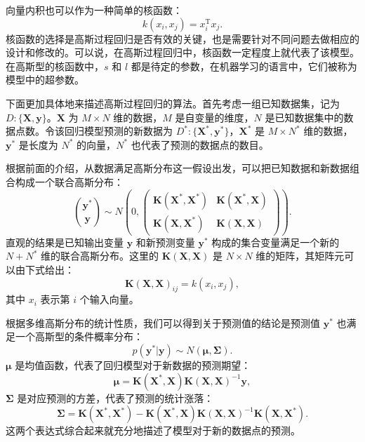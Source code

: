 向量内积也可以作为一种简单的核函数：
\begin{equation}
k(x_i,x_j)=x_i^{\mathrm T}x_j.
\tag{8.1.14}
\end{equation}
核函数的选择是高斯过程回归是否有效的关键，也是需要针对不同问题去做相应的设计和修改的。可以说，在高斯过程回归中，核函数一定程度上就代表了该模型。在高斯型的核函数中，$s$ 和 $l$ 都是待定的参数，在机器学习的语言中，它们被称为模型中的超参数。

下面更加具体地来描述高斯过程回归的算法。首先考虑一组已知数据集，记为 $D:\{\mathbf X,\mathbf y\}$。$\mathbf X$ 为 $M\times N$ 维的数据，$M$ 是自变量的维度，$N$ 是已知数据集中的数据点数。令该回归模型预测的新数据为 $D^*:\{\mathbf X^*,\mathbf y^*\}$，$\mathbf X^*$ 是 $M\times N^*$ 维的数据，$\mathbf y^*$ 是长度为 $N^*$ 的向量，$N^*$ 也代表了预测的数据点的数目。

根据前面的介绍，从数据满足高斯分布这一假设出发，可以把已知数据和新数据组合构成一个联合高斯分布：
\begin{equation}
\binom{\mathbf y^*}{\mathbf y}\sim N\left(0,
\begin{pmatrix}
\mathbf K(\mathbf X^*,\mathbf X^*)&\mathbf K(\mathbf X^*,\mathbf X)\\
\mathbf K(\mathbf X,\mathbf X^*)&\mathbf K(\mathbf X,\mathbf X)
\end{pmatrix}\right).
\tag{8.1.15}
\end{equation}
直观的结果是已知输出变量 $\mathbf y$ 和新预测变量 $\mathbf y^*$ 构成的集合变量满足一个新的 $N+N^*$ 维的联合高斯分布。这里的 $\mathbf K(\mathbf X,\mathbf X)$ 是 $N\times N$ 维的矩阵，其矩阵元可以由下式给出：
\begin{equation}
\mathbf K(\mathbf X,\mathbf X)_{ij}=k(x_i,x_j),
\tag{8.1.16}
\end{equation}
其中 $x_i$ 表示第 $i$ 个输入向量。

根据多维高斯分布的统计性质，我们可以得到关于预测值的结论是预测值 $\mathbf y^*$ 也满足一个高斯型的条件概率分布：
\begin{equation}
p(\mathbf y^*|\mathbf y)\sim N(\bm\mu,\bm\Sigma).
\tag{8.1.17}
\end{equation}
$\bm\mu$ 是均值函数，代表了回归模型对于新数据的预测期望：
\begin{equation}
\bm\mu=\mathbf K(\mathbf X^*,\mathbf X)\mathbf K(\mathbf X,\mathbf X)^{-1}\mathbf y,
\tag{8.1.18}
\end{equation}
$\bm\Sigma$ 是对应预测的方差，代表了预测的统计涨落：
\begin{equation}
\bm\Sigma=\mathbf K(\mathbf X^*,\mathbf X^*)-\mathbf K(\mathbf X^*,\mathbf X)\mathbf K(\mathbf X,\mathbf X)^{-1}\mathbf K(\mathbf X,\mathbf X^*).
\tag{8.1.19}
\end{equation}
这两个表达式综合起来就充分地描述了模型对于新的数据点的预测。

